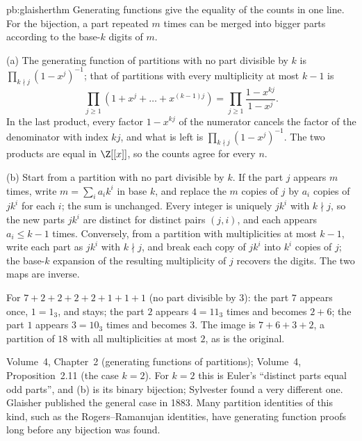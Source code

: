 \begin{solution}{pb:glaisherthm}
\idea Generating functions give the equality of the counts in one line. For the bijection, a part repeated $m$ times can be
merged into bigger parts according to the base-$k$ digits of $m$.

\writeup (a) The generating function of partitions with no part divisible by $k$ is $\prod_{k\nmid j}(1-x^j)^{-1}$; that of
partitions with every multiplicity at most $k-1$ is
\[
\prod_{j\ge1}(1+x^j+\dots+x^{(k-1)j})=\prod_{j\ge1}\frac{1-x^{kj}}{1-x^j}.
\]
In the last product, every factor $1-x^{kj}$ of the numerator cancels the factor of the denominator with index $kj$, and what is
left is $\prod_{k\nmid j}(1-x^j)^{-1}$. The two products are equal in $\Z[[x]]$, so the counts agree for every $n$.

(b) Start from a partition with no part divisible by $k$. If the part $j$ appears $m$ times, write $m=\sum_ia_ik^i$ in base $k$, and
replace the $m$ copies of $j$ by $a_i$ copies of $jk^i$ for each $i$; the sum is unchanged. Every integer is uniquely $jk^i$ with
$k\nmid j$, so the new parts $jk^i$ are distinct for distinct pairs $(j,i)$, and each appears $a_i\le k-1$ times. Conversely, from a
partition with multiplicities at most $k-1$, write each part as $jk^i$ with $k\nmid j$, and break each copy of $jk^i$ into $k^i$
copies of $j$; the base-$k$ expansion of the resulting multiplicity of $j$ recovers the digits. The two maps are inverse.

For $7+2+2+2+2+1+1+1$ (no part divisible by $3$): the part $7$ appears once, $1=1_3$, and stays; the part $2$ appears $4=11_3$
times and becomes $2+6$; the part $1$ appears $3=10_3$ times and becomes $3$. The image is $7+6+3+2$, a partition of $18$ with all
multiplicities at most $2$, as is the original.

\tools Volume~4, Chapter~2 (generating functions of partitions); Volume~4, Proposition~2.11 (the case $k=2$).
\leads For $k=2$ this is Euler's ``distinct parts equal odd parts'', and (b) is its binary bijection; Sylvester found a very
different one. Glaisher published the general case in 1883. Many partition identities of this kind, such as the Rogers--Ramanujan identities, have generating
function proofs long before any bijection was found.
\end{solution}

